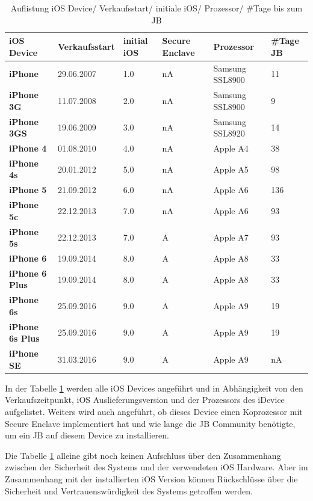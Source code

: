 \begin{table}[htp!]
    \begin{center}
        \begin{tabular}{|p{30mm}|p{27mm}|p{12mm}|p{18mm}|p{2cm}|p{22mm}|} \hline
            \textbf{iOS Device} & \textbf{Verkaufsstart} & \textbf{initial iOS} & \textbf{Secure Enclave} & \textbf{Prozessor}  & \textbf{\#Tage JB} \\ \hline
            \textbf{iPhone} & 29.06.2007  & 1.0 & nA & Samsung SSL8900 & 11\\ \hline
            \textbf{iPhone 3G} & 11.07.2008 & 2.0 & nA & Samsung SSL8900 & 9\\ \hline
            \textbf{iPhone 3GS} & 19.06.2009 & 3.0 & nA & Samsung SSL8920 & 14\\ \hline
            \textbf{iPhone 4} & 01.08.2010 & 4.0 & nA & Apple A4 & 38 \\ \hline
            \textbf{iPhone 4s} & 20.01.2012 & 5.0 & nA & Apple A5 & 98 \\ \hline 
            \textbf{iPhone 5} & 21.09.2012 & 6.0 & nA & Apple A6 & 136 \\ \hline
            \textbf{iPhone 5c} & 22.12.2013 & 7.0 & nA & Apple A6 & 93 \\ \hline
            \textbf{iPhone 5s} & 22.12.2013 & 7.0 & A & Apple A7 & 93 \\ \hline
            \textbf{iPhone 6} & 19.09.2014 & 8.0 & A & Apple A8 & 33\\ \hline
            \textbf{iPhone 6 Plus} & 19.09.2014 & 8.0 & A & Apple A8 & 33\\ \hline
            \textbf{iPhone 6s} & 25.09.2016 & 9.0 & A & Apple A9 & 19\\ \hline
            \textbf{iPhone 6s Plus} & 25.09.2016 & 9.0 & A & Apple A9 & 19\\ \hline
            \textbf{iPhone SE} & 31.03.2016 & 9.0 & A & Apple A9 & nA\\ \hline  
        \end{tabular} 
        \caption{Auflistung iOS Device/ Verkaufsstart/ initiale iOS/ Prozessor/ \#Tage bis zum JB}
        \label{tab:iOSHW}
    \end{center}
\end{table}
In der Tabelle \ref{tab:iOSHW} werden alle iOS Devices angeführt und in Abhängigkeit von den Verkaufszeitpunkt, iOS Auslieferungsversion und der Prozessors des iDevice aufgelistet. Weiters wird auch angeführt, ob dieses Device einen Koprozessor mit Secure Enclave implementiert hat und wie lange die JB Community benötigte, um ein JB auf diesem Device zu installieren.\par
Die Tabelle \ref{tab:iOSHW} alleine gibt noch keinen Aufschluss über den Zusammenhang zwischen der Sicherheit des Systems und der verwendeten iOS Hardware. Aber im Zusammenhang mit der installierten iOS Version können Rückschlüsse über die Sicherheit und Vertrauenswürdigkeit des Systems getroffen werden.

